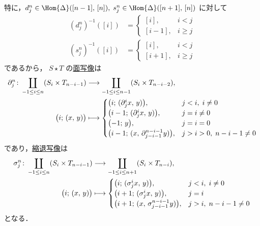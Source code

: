 \documentclass[TQFT_main]{subfiles}
\begin{document}
特に，$d^n_j \in \Hom{\Delta}([n-1],\, [n]),\; s^n_j \in \Hom{\Delta}([n+1],\, [n])$ に対して
\begin{align}
    (d^n_j)^{-1} ([i]) &= \begin{cases}
        [i], &i < j \\
        [i-1], &i \ge j
    \end{cases} \\
    (s^n_j)^{-1} ([i]) &= \begin{cases}
        [i], &i < j \\
        [i+1], &i \ge j
    \end{cases}
\end{align}
であるから，
$S \star T$ の\hyperref[def:SimpSet]{面写像}は
\begin{align}
    \label{eq:face-join}
    \partial^n_j \colon \coprod_{-1 \le i \le n} (S_i \times T_{n-i-1}) &\longrightarrow \coprod_{-1 \le i \le n-1} (S_i \times T_{n-i-2}), \\
    \bigl( i;\, (x,\, y) \bigr) &\longmapsto 
    \begin{cases}
        \bigl(i;\, (\partial_j^i x,\, y) \bigr), &j < i,\; i\neq 0 \\
        \bigl(i-1;\, (\partial_j^i x,\, y) \bigr), &j = i \neq 0 \\
        \bigl(-1;\, y \bigr), &j = i = 0 \\
        \bigl(i-1;\, (x,\, \partial^{n-i-1}_{j-i-1} y) \bigr), &j > i > 0,\; n-i-1\neq 0
    \end{cases}
\end{align}
であり，\hyperref[def:SimpSet]{縮退写像}は
\begin{align}
    \label{eq:degen-join}
    \sigma^n_j \colon \coprod_{-1 \le i \le n} (S_i \times T_{n-i-1}) &\longrightarrow \coprod_{-1 \le i \le n+1} (S_i \times T_{n-i}), \\
    \bigl( i;\, (x,\, y) \bigr) &\longmapsto 
    \begin{cases}
        \bigl(i;\, (\sigma_j^i x,\, y) \bigr), &j < i,\; i\neq 0 \\
        \bigl(i+1;\, (\sigma_{j}^i x,\, y) \bigr), &j = i \\
        \bigl(i+1;\, (x,\, \sigma^{n-i-1}_{j-i-1} y) \bigr), &j > i,\; n-i-1\neq 0 \\
    \end{cases}
\end{align}
となる．
\end{document}
